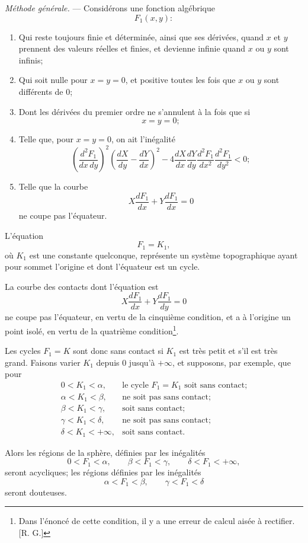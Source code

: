 \documentclass[11pt]{article}
\begin{document}
\emph{Méthode générale.} --- Considérons une fonction algébrique
\[
F_1(x,y):
\]
\begin{enumerate}[label=\arabic*\textsuperscript{o}, leftmargin=3em]
\item Qui reste toujours finie et déterminée, ainsi que ses dérivées, quand $x$ et $y$ prennent des valeurs réelles et finies, et devienne infinie quand $x$ ou $y$ sont infinis;
\item Qui soit nulle pour $x=y=0$, et positive toutes les fois que $x$ ou $y$ sont différents de 0;
\item Dont les dérivées du premier ordre ne s’annulent à la fois que si
\[
x=y=0;
\]
\item Telle que, pour $x=y=0$, on ait l’inégalité
\[
\left(\frac{d^2F_1}{dx\,dy}\right)^2\left(\frac{dX}{dy}-\frac{dY}{dx}\right)^2
-4\frac{dX}{dx}\frac{dY}{dy}\frac{d^2F_1}{dx^2}\frac{d^2F_1}{dy^2}<0;
\]
\item Telle que la courbe
\[
X\frac{dF_1}{dx}+Y\frac{dF_1}{dx}=0
\]
ne coupe pas l’équateur.
\end{enumerate}

L’équation
\[
F_1=K_1,
\]
où $K_1$ est une constante quelconque, représente un système topographique ayant pour sommet l’origine et dont l’équateur est un cycle.

La courbe des contacts dont l’équation est
\[
X\frac{dF_1}{dx}+Y\frac{dF_1}{dy}=0
\]
ne coupe pas l’équateur, en vertu de la cinquième condition, et a à l’origine un point isolé, en vertu de la quatrième condition\footnote{Dans l’énoncé de cette condition, il y a une erreur de calcul aisée à rectifier. [R. G.]}.

Les cycles $F_1=K$ sont donc sans contact si $K_1$ est très petit et s’il est très grand. Faisons varier $K_1$ depuis 0 jusqu’à $+\infty$, et supposons, par exemple, que pour
\[
\begin{array}{ll}
0<K_1<\alpha, & \text{le cycle }F_1=K_1\text{ soit sans contact;}\\
\alpha<K_1<\beta, & \text{ne soit pas sans contact;}\\
\beta<K_1<\gamma, & \text{soit sans contact;}\\
\gamma<K_1<\delta, & \text{ne soit pas sans contact;}\\
\delta<K_1<+\infty, & \text{soit sans contact.}
\end{array}
\]

Alors les régions de la sphère, définies par les inégalités
\[
0<F_1<\alpha,
\qquad
\beta<F_1<\gamma,
\qquad
\delta<F_1<+\infty,
\]
seront acycliques; les régions définies par les inégalités
\[
\alpha<F_1<\beta,
\qquad
\gamma<F_1<\delta
\]
seront douteuses.
\end{document}

